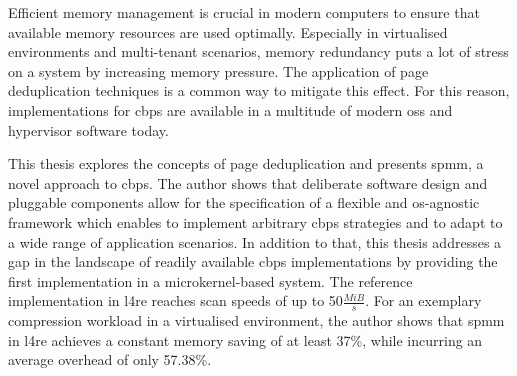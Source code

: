 Efficient memory management is crucial in modern computers to ensure that available memory resources are used optimally.
Especially in virtualised environments and multi-tenant scenarios, memory redundancy puts a lot of stress on a system by increasing memory pressure.
The application of page deduplication techniques is a common way to mitigate this effect.
For this reason, implementations for \ac{cbps} are available in a multitude of modern \acp{os} and hypervisor software today.

This thesis explores the concepts of page deduplication and presents \acs{spmm}, a novel approach to \ac{cbps}.
The author shows that deliberate software design and pluggable components allow for the specification of a flexible and \ac{os}-agnostic framework which enables to implement arbitrary \ac{cbps} strategies and to adapt to a wide range of application scenarios.
In addition to that, this thesis addresses a gap in the landscape of readily available \ac{cbps} implementations by providing the first implementation in a microkernel-based system.
The reference implementation in \acs{l4re} reaches scan speeds of up to 50$\frac{MiB}{s}$.
For an exemplary compression workload in a virtualised environment, the author shows that \acs{spmm} in \acs{l4re} achieves a constant memory saving of at least 37\%, while incurring an average overhead of only 57.38\%.
